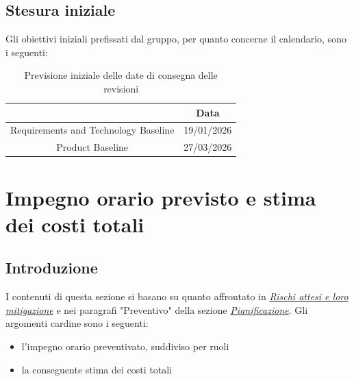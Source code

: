\documentclass[a4paper,12pt]{article}
\begin{document}
    \subsection{Stesura iniziale}
        Gli obiettivi iniziali prefissati dal gruppo, per quanto concerne il calendario, sono i seguenti:
        \begin{table}[H]
            \centering
            \label{tab:cal1}
            \begin{tabular}{|c|c|}
            \hline
                \rowcolor{lightgray}{\textbf{Revisione}} & {\textbf{Data}}  \\
            \hline
                Requirements and Technology Baseline & 19/01/2026 \\
            \hline
                Product Baseline & 27/03/2026 \\
            \hline
            \end{tabular}
            \caption{Previsione iniziale delle date di consegna delle revisioni}
        \end{table}


\newpage
\section{Impegno orario previsto e stima dei costi totali}
    \subsection{Introduzione}
        I contenuti di questa sezione si basano su quanto affrontato in \href{sec:rischi}{\textit{Rischi attesi e loro mitigazione}} e nei paragrafi "Preventivo" della sezione \href{sec:prev}{\textit{Pianificazione}}. Gli argomenti cardine sono i seguenti:
        \begin{itemize}
            \item l'impegno orario preventivato, suddiviso per ruoli
            \item la conseguente stima dei costi totali 
        \end{itemize}
\end{document}
